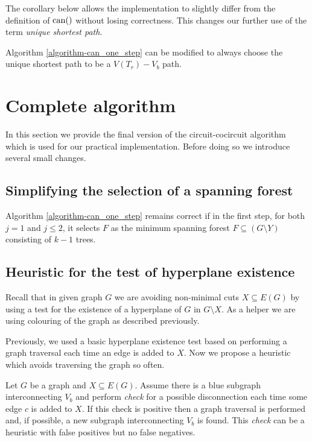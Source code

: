 The corollary below allows the implementation to slightly differ from the definition of $\operatorname{can}()$ without losing correctness. This changes our further use of the term \textit{unique shortest path}.

\begin{cor}
	Algorithm \ref{algorithm-can_one_step} can be modified to always choose the unique shortest path to be a $V(T_r){-}V_b$ path.
\end{cor}

\section{Complete algorithm}

In this section we provide the final version of the circuit-cocircuit algorithm which is used for our practical implementation. Before doing so we introduce several small changes.


\subsection*{Simplifying the selection of a spanning forest}

\begin{claim}
	\label{forest_sel_claim}
	Algorithm \ref{algorithm-can_one_step} remains correct if in the first step, for both $j = 1$ and $j \leq 2$, it selects $F$ as the minimum spanning forest \break ${F \subseteq (G \setminus Y)}$ consisting of $k-1$ trees.
\end{claim}

\subsection*{Heuristic for the test of hyperplane existence}
Recall that in given graph $G$ we are avoiding non-minimal cuts $X \subseteq E(G)$ by using a test for the existence of a hyperplane of $G$ in $G \setminus X$. As a helper we are using colouring of the graph as described previously.

Previously, we used a basic hyperplane existence test based on performing a graph traversal each time an edge is added to $X$. Now we propose a heuristic which avoids traversing the graph so often.

\begin{claim}
	Let $G$ be a graph and $X \subseteq E(G)$. Assume there is a blue subgraph interconnecting $V_b$ and perform \textit{check} for a possible disconnection each time some edge $c$ is added to $X$. If this check is positive then a graph traversal is performed and, if possible, a new subgraph interconnecting $V_b$ is found. This \textit{check} can be a heuristic with false positives but no false negatives.
\end{claim}

